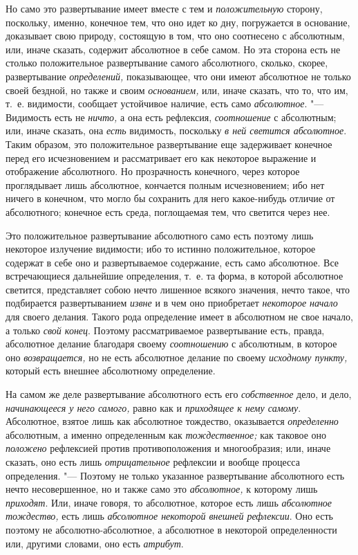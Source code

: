 Но само это развертывание имеет вместе с тем и
{\em положительную} сторону, поскольку, именно,
конечное тем, что оно идет ко дну, погружается в основание, доказывает свою
природу, состоящую в том, что оно соотнесено с абсолютным, или, иначе
сказать, содержит абсолютное в себе самом. Но эта сторона есть не столько
положительное развертывание самого абсолютного, сколько, скорее,
развертывание {\em определений,} показывающее, что они
имеют абсолютное не только своей бездной, но также и своим
{\em основанием,} или, иначе сказать, что то, что им,
т.~е. видимости, сообщает устойчивое наличие, есть само
{\em абсолютное}. "--- Видимость есть не
{\em ничто,} а она есть рефлексия,
{\em соотношение} с абсолютным; или, иначе сказать, она
{\em есть} видимость, поскольку
{\em в ней светится абсолютное}. Таким образом, это
положительное развертывание еще задерживает конечное перед его
исчезновением и рассматривает его как некоторое выражение и отображение
абсолютного. Но прозрачность конечного, через которое проглядывает лишь
абсолютное, кончается полным исчезновением; ибо нет ничего в конечном, что
могло бы сохранить для него какое-нибудь отличие от абсолютного; конечное
есть среда, поглощаемая тем, что светится через нее.

Это положительное развертывание абсолютного само есть поэтому лишь некоторое
излучение видимости; ибо то истинно положительное, которое содержат в себе
оно и развертываемое содержание, есть само абсолютное. Все встречающиеся
дальнейшие определения, т.~е. та форма, в которой абсолютное светится,
представляет собою нечто лишенное всякого значения, нечто такое, что
подбирается развертыванием {\em извне} и в чем оно
приобретает {\em некоторое начало} для своего делания.
Такого рода определение имеет в абсолютном не свое начало, а только
{\em свой конец}. Поэтому рассматриваемое развертывание
есть, правда, абсолютное делание благодаря своему
{\em соотношению} с абсолютным, в которое оно
{\em возвращается,} но не есть абсолютное делание по
своему {\em исходному пункту,} который есть внешнее
абсолютному определение.

На самом же деле развертывание абсолютного есть его
{\em собственное} дело, и дело,
{\em начинающееся у него самого,} равно как и
{\em приходящее к нему самому}. Абсолютное, взятое лишь
как абсолютное тождество, оказывается {\em определенно}
абсолютным, а именно определенным как
{\em тождественное;} как таковое оно
{\em положено} рефлексией против противоположения и
многообразия; или, иначе сказать, оно есть лишь
{\em отрицательное} рефлексии и вообще процесса
определения. "--- Поэтому не только указанное развертывание абсолютного есть
нечто несовершенное, но и также само это
{\em абсолютное,} к которому лишь
{\em приходят}. Или, иначе говоря, то абсолютное,
которое есть лишь {\em абсолютное тождество,} есть лишь
{\em абсолютное некоторой внешней рефлексии}. Оно есть
поэтому не абсолютно-абсолютное, а абсолютное в некоторой определенности
или, другими словами, оно есть {\em атрибут}.

